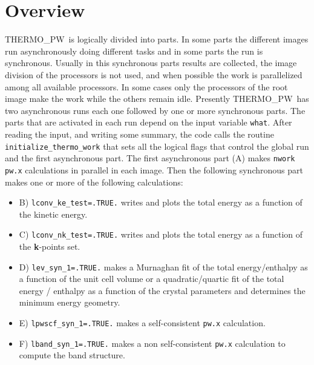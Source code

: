 \documentclass[12pt,a4paper]{article}
\def\tpw{{\sc THERMO\_PW}}
\begin{document}
\section{\color{coral}Overview}
\tpw\ is logically divided into parts. In some parts the different
images run asynchronously doing different tasks and in some parts the
run is synchronous. Usually in this synchronous parts results are 
collected, the image division of the processors is not used, and when possible
the work is parallelized among all available processors. In some cases
only the processors of the root image make the work while the others remain
idle.
Presently \tpw\ has two asynchronous runs each one followed
by one or more synchronous parts. The parts that are activated in
each run depend on the input variable \texttt{what}. After reading the input,
and writing some summary, the code calls the routine 
\texttt{initialize\_thermo\_work} that sets all the
logical flags that control the global run and the first asynchronous
part. The first asynchronous part (A) makes \texttt{nwork} \texttt{pw.x} 
calculations in parallel in each image. 
Then the following synchronous part makes one or more of
the following calculations:
\begin{itemize}

\item
B) \texttt{lconv\_ke\_test=.TRUE.} writes and plots the total
energy as a function of the kinetic energy.

\item
C) \texttt{lconv\_nk\_test=.TRUE.} writes and plots the total energy
as a function of the {\bf k}-points set.

\item
D) \texttt{lev\_syn\_1=.TRUE.} makes a Murnaghan fit of the 
total energy/enthalpy as a function of the unit cell volume or 
a quadratic/quartic fit of the total energy / enthalpy as a function 
of the crystal parameters and determines the minimum energy geometry.

\item
E) \texttt{lpwscf\_syn\_1=.TRUE.} makes a self-consistent \texttt{pw.x} 
calculation.

\item
F) \texttt{lband\_syn\_1=.TRUE.} makes a non self-consistent \texttt{pw.x}
calculation to compute the band structure.

\end{itemize}
\end{document}
